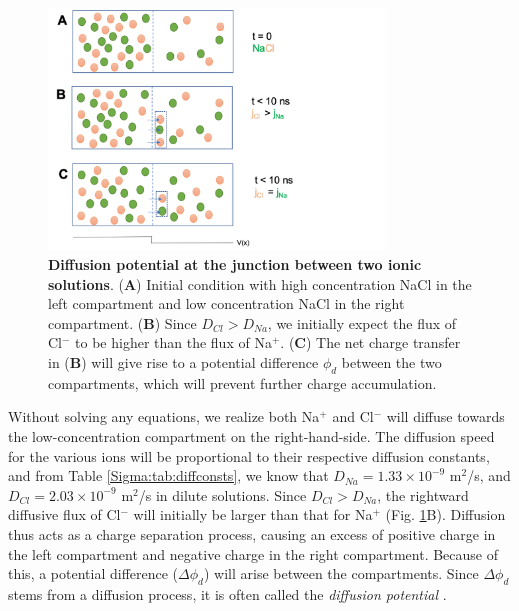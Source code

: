 \begin{figure}[!ht]
\begin{center}
\includegraphics[width=0.8\textwidth]{Figures/Schemes/Diffusionpot.png}
\end{center}
\caption{\textbf{Diffusion potential at the junction between two ionic solutions}. ({\bf A}) Initial condition with high concentration NaCl in the left compartment and low concentration NaCl in the right compartment. ({\bf B}) Since $D_{Cl} > D_{Na}$, we initially expect the flux of Cl$^-$ to be higher than the flux of Na$^+$. ({\bf C}) The net charge transfer in ({\bf B}) will give rise to a potential difference $\phi_d$ between the two compartments, which will prevent further charge accumulation. }
\label{Schemes:fig:diffpot}
\end{figure}

Without solving any equations, we realize both Na$^+$ and Cl$^-$ will diffuse towards the low-concentration compartment on the right-hand-side. The diffusion speed for the various ions will be proportional to their respective diffusion constants, and from Table \ref{Sigma:tab:diffconsts}, we know that $D_{Na} = 1.33 \times 10^{-9}$ m$^2$/s, and $D_{Cl} = 2.03 \times 10^{-9}$ m$^2$/s in dilute solutions. Since $D_{Cl} > D_{Na}$, the rightward diffusive flux of Cl$^-$ will initially be larger than that for Na$^+$  (Fig. \ref{Schemes:fig:diffpot}B). Diffusion thus acts as a charge separation process, causing an excess of positive charge in the left compartment and negative charge in the right compartment. Because of this, a potential difference ($\Delta \phi_d$) will arise between the compartments. Since $\Delta \phi_d$ stems from a diffusion process, it is often called the \textit{diffusion potential} . 

